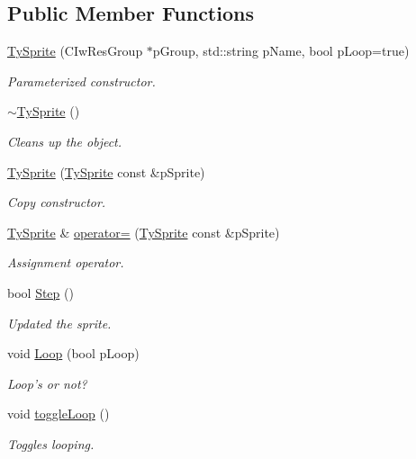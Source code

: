 \subsection*{Public Member Functions}
\begin{DoxyCompactItemize}
\item 
\hyperlink{class_ty_sprite_aa7fc2789b9e037951094040b8ca18106}{TySprite} (CIwResGroup $\ast$pGroup, std::string pName, bool pLoop=true)
\begin{DoxyCompactList}\small\item\em Parameterized constructor. \end{DoxyCompactList}\item 
\hyperlink{class_ty_sprite_afaaf5f1545c2e06fb4c123eaada32f58}{$\sim$TySprite} ()
\begin{DoxyCompactList}\small\item\em Cleans up the object. \end{DoxyCompactList}\item 
\hyperlink{class_ty_sprite_a16bfc1711299edb062ec736587ffa050}{TySprite} (\hyperlink{class_ty_sprite}{TySprite} const \&pSprite)
\begin{DoxyCompactList}\small\item\em Copy constructor. \end{DoxyCompactList}\item 
\hyperlink{class_ty_sprite}{TySprite} \& \hyperlink{class_ty_sprite_ae1148290ea5e0fb2b9536bbf03f7c22d}{operator=} (\hyperlink{class_ty_sprite}{TySprite} const \&pSprite)
\begin{DoxyCompactList}\small\item\em Assignment operator. \end{DoxyCompactList}\item 
bool \hyperlink{class_ty_sprite_a3a24eaa58fc18b1c55fefa0a49b5ef6d}{Step} ()
\begin{DoxyCompactList}\small\item\em Updated the sprite. \end{DoxyCompactList}\item 
void \hyperlink{class_ty_sprite_a60a69a064d3f6e4077832450d0a3641b}{Loop} (bool pLoop)
\begin{DoxyCompactList}\small\item\em Loop's or not? \end{DoxyCompactList}\item 
void \hyperlink{class_ty_sprite_aaf37177bb3e44f8519bd2defe809c503}{toggleLoop} ()
\begin{DoxyCompactList}\small\item\em Toggles looping. \end{DoxyCompactList}\item 

\end{DoxyCompactItemize}
